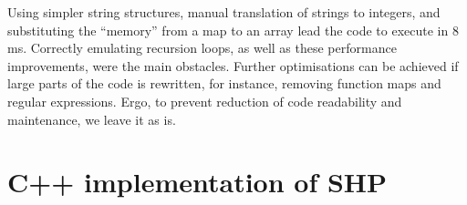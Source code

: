 \documentclass[12pt]{article}
\begin{document}
Using simpler string structures, manual translation of strings to integers, and substituting the ``memory'' from a map to an array lead the code to execute in $8$ ms. Correctly emulating recursion loops, as well as these performance improvements, were the main obstacles. Further optimisations can be achieved if large parts of the code is rewritten, for instance, removing function maps and regular expressions. Ergo, to prevent reduction of code readability and maintenance, we leave it as is.




\appendix

\section{C++ implementation of SHP}\label{app:impl}

\end{document}

